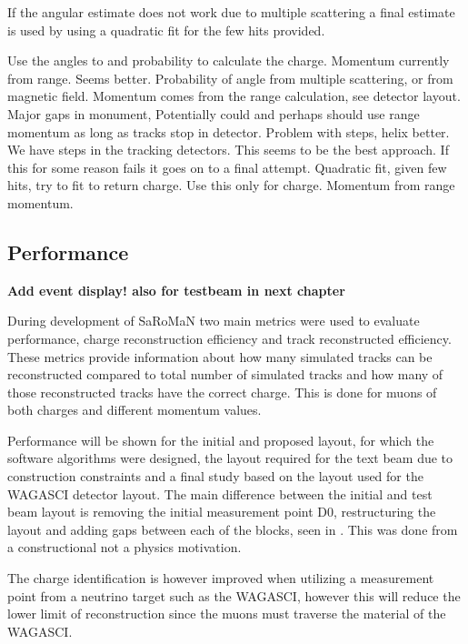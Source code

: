 If the angular estimate does not work due to multiple scattering a final estimate is used by using a quadratic fit for the few hits provided.

Use the angles to and probability to calculate the charge. Momentum currently from range. Seems better.
Probability of angle from multiple scattering, or from magnetic field. 
Momentum comes from the range calculation, see detector layout. Major gaps in monument,  Potentially could and perhaps should use range momentum as long as tracks stop in detector. Problem with steps, helix better.
We have steps in the tracking detectors.
This seems to be the best approach. If this for some reason fails it goes on to a final attempt.
Quadratic fit, given few hits, try to fit to return charge. Use this only for charge. Momentum from range momentum.
\fi

\subsection{Performance}

\textbf{Add event display! also for testbeam in next chapter}

During development of SaRoMaN two main metrics were used to evaluate performance, charge reconstruction efficiency and track reconstructed efficiency. These metrics provide information about how many simulated tracks can be reconstructed compared to total number of simulated tracks and how many of those reconstructed tracks have the correct charge. This is done for muons of both charges and different momentum values.

Performance will be shown for the initial and proposed layout, for which the software algorithms were designed, the layout required for the text beam due to construction constraints and a final study based on the layout used for the WAGASCI detector layout. The main difference between the initial and test beam layout is removing the initial measurement point D0, restructuring  the layout and adding gaps between each of the blocks, seen in . This was done from a constructional not a physics motivation.

The charge identification is however improved when utilizing a measurement point from a neutrino target such as the WAGASCI, however this will reduce the lower limit of reconstruction since the muons must traverse the material of the WAGASCI. 

